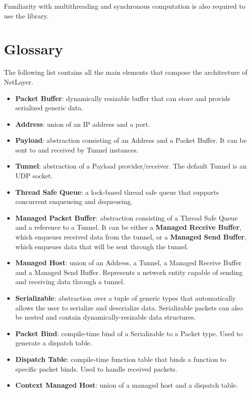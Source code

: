 \documentclass[11pt]{report}
\newcommand{\+}{\discretionary{\mbox{\scriptsize$\hookleftarrow$}}{}{}}
\renewcommand\emph{\textbf}
\begin{document}
                Familiarity with multithreading and synchronous computation is also required to use the library.

        \section{Glossary}

            The following list contains all the main elements that compose the architecture of NetLayer.

            \begin{itemize}
                \item \emph{Packet Buffer}: dynamically resizable buffer that can store and provide serialized generic data.
                \item \emph{Address}: union of an IP address and a port.
                \item \emph{Payload}: abstraction consisting of an Address and a  Packet Buffer. It can be sent to and received by Tunnel instances.
                \item \emph{Tunnel}: abstraction of a Payload provider/receiver. The default Tunnel is an UDP socket.
                \item \emph{Thread Safe Queue}: a lock-based thread safe queue that supports concurrent enqueueing and dequeueing.
                \item \emph{Managed Packet Buffer}: abstraction consisting of a Thread Safe Queue and a reference to a Tunnel. It can be either a \emph{Managed Receive Buffer}, which enqueues received data from the tunnel, or a \emph{Managed Send Buffer}, which enqueues data that will be sent through the tunnel.
                \item \emph{Managed Host}: union of an Address, a Tunnel, a Managed Receive Buffer and a Managed Send Buffer. Represents a network entity capable of sending and receiving data through a tunnel.
                \item \emph{Serializable}: abstraction over a tuple of generic types that automatically allows the user to serialize and deserialize data. Serializable packets can also be nested and contain dynamically-resizable data structures.
                \item \emph{Packet Bind}: compile-time bind of a Serializable to a Packet type. Used to generate a dispatch table.
                \item \emph{Dispatch Table}: compile-time function table that binds a function to specific packet binds. Used to handle received packets.
                \item \emph{Context Managed Host}: union of a managed host and a dispatch table.
            \end{itemize}
\end{document}
